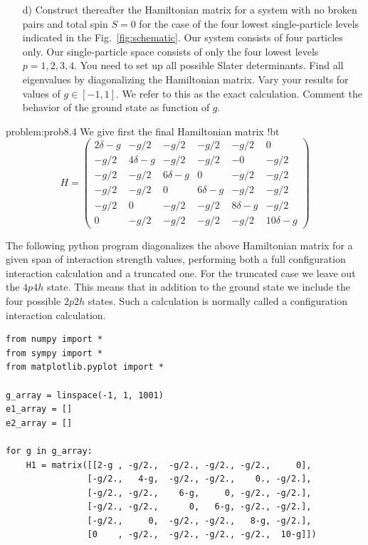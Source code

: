 \begin{prob}
\begin{enumerate}
\item[d)]
Construct thereafter the Hamiltonian matrix for a system with no
  broken pairs and total spin $S=0$ for the case of the four lowest
  single-particle levels indicated in the
  Fig.~\ref{fig:schematic}. Our system consists of four particles
  only.  Our single-particle space consists of only the four lowest
  levels $p=1,2,3,4$.  You need to set up all possible Slater
  determinants.  Find all eigenvalues by diagonalizing the Hamiltonian
  matrix.  Vary your results for values of $g\in [-1,1]$.  We refer to
  this as the exact calculation. Comment the behavior of the ground
  state as function of $g$.
\end{enumerate}
\end{prob}

\begin{sol}{problem:prob8.4}
We give first the final Hamiltonian matrix
!bt
\[
H = \left (
\begin{array}{cccccc}
2\delta -g & -g/2 & -g/2 & -g/2 & -g/2 & 0 \\
 -g/2 & 4\delta -g & -g/2 & -g/2 & -0 & -g/2 \\
-g/2 & -g/2 & 6\delta -g & 0 & -g/2 & -g/2 \\
 -g/2 & -g/2 & 0 & 6\delta-g & -g/2 & -g/2 \\
 -g/2 & 0 & -g/2 & -g/2 & 8\delta-g & -g/2 \\
0 & -g/2 & -g/2 & -g/2 & -g/2 & 10\delta -g
\end{array} \right )
\]

The following python program diagonalizes the above Hamiltonian matrix for a given span of interaction strength values, performing both a full configuration interaction calculation and a truncated one. For the truncated case we leave out the $4p4h$ state. This means that in addition to the ground state we include the four possible $2p2h$ states. Such a calculation is normally called a configuration interaction calculation.
\begin{lstlisting}
from numpy import *
from sympy import *
from matplotlib.pyplot import *

g_array = linspace(-1, 1, 1001)
e1_array = []
e2_array = []

for g in g_array:
	H1 = matrix([[2-g , -g/2.,  -g/2., -g/2., -g/2.,     0],
		        [-g/2.,   4-g,  -g/2., -g/2.,    0., -g/2.],
		        [-g/2., -g/2.,    6-g,     0, -g/2., -g/2.],
				[-g/2., -g/2.,      0,   6-g, -g/2., -g/2.],
				[-g/2.,     0,  -g/2., -g/2.,   8-g, -g/2.],
				[0    , -g/2.,  -g/2., -g/2., -g/2.,  10-g]])


\end{lstlisting}
\end{sol}

